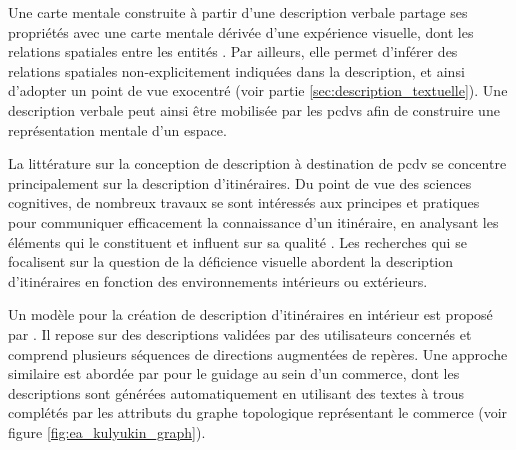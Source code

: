 


Une carte mentale construite à partir d'une description verbale partage ses propriétés avec une carte mentale dérivée d'une expérience visuelle, dont les relations spatiales entre les entités \citep{Denis1992}. Par ailleurs, elle permet d'inférer des relations spatiales non-explicitement indiquées dans la description, et ainsi d'adopter un point de vue exocentré \citep{Avraamides2004} (voir partie \ref{sec:description_textuelle}). Une description verbale peut ainsi être mobilisée par les \glspl{pcdv} afin de construire une représentation mentale d'un espace.

\newpar{}


La littérature sur la conception de description à destination de \gls{pcdv} se concentre principalement sur la description d'itinéraires. Du point de vue des sciences cognitives, de nombreux travaux se sont intéressés aux principes et pratiques pour communiquer efficacement la connaissance d’un itinéraire, en analysant les éléments qui le constituent et influent sur sa qualité \citep{Allen2000,Lovelace1999}. Les recherches qui se focalisent sur la question de la déficience visuelle abordent la description d'itinéraires en fonction des environnements intérieurs ou extérieurs.

\newpar{}

Un modèle pour la création de description d'itinéraires en intérieur est proposé par \citet{Troeger2020}. Il repose sur des descriptions validées par des utilisateurs concernés et comprend plusieurs séquences de directions augmentées de repères. Une approche similaire est abordée par \citet{Kulyukin2008} pour le guidage au sein d'un commerce, dont les descriptions sont générées automatiquement en utilisant des textes à trous complétés par les attributs du graphe topologique représentant le commerce (voir figure \ref{fig:ea_kulyukin_graph}).


